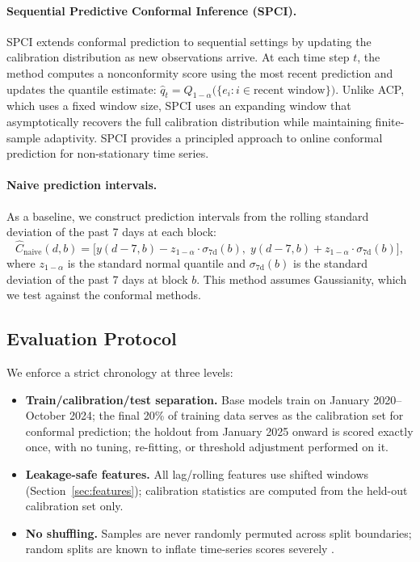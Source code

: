 \documentclass[preprint,12pt]{elsarticle}
\begin{document}
\begin{enumerate}
\paragraph{Sequential Predictive Conformal Inference (SPCI).}
SPCI extends conformal prediction to sequential settings by updating the calibration distribution as new observations arrive. At each time step $t$, the method computes a nonconformity score using the most recent prediction and updates the quantile estimate: $\hat{q}_t = Q_{1-\alpha}\bigl(\{e_i : i \in \text{recent window}\}\bigr)$. Unlike ACP, which uses a fixed window size, SPCI uses an expanding window that asymptotically recovers the full calibration distribution while maintaining finite-sample adaptivity. SPCI provides a principled approach to online conformal prediction for non-stationary time series.

\paragraph{Naive prediction intervals.}
As a baseline, we construct prediction intervals from the rolling standard deviation of the past 7 days at each block:
\begin{equation}
  \hat{C}_{\text{naive}}(d,b) = \bigl[y(d-7,b) - z_{1-\alpha} \cdot \sigma_{7\text{d}}(b), \; y(d-7,b) + z_{1-\alpha} \cdot \sigma_{7\text{d}}(b)\bigr],
  \label{eq:naive_pi}
\end{equation}
where $z_{1-\alpha}$ is the standard normal quantile and $\sigma_{7\text{d}}(b)$ is the standard deviation of the past 7 days at block $b$. This method assumes Gaussianity, which we test against the conformal methods.

\subsection{Evaluation Protocol}\label{sec:protocol}

We enforce a strict chronology at three levels:
\begin{itemize}
  \item \textbf{Train/calibration/test separation.} Base models train on January 2020--October 2024; the final 20\% of training data serves as the calibration set for conformal prediction; the holdout from January 2025 onward is scored exactly once, with no tuning, re-fitting, or threshold adjustment performed on it.
  \item \textbf{Leakage-safe features.} All lag/rolling features use shifted windows (Section~\ref{sec:features}); calibration statistics are computed from the held-out calibration set only.
  \item \textbf{No shuffling.} Samples are never randomly permuted across split boundaries; random splits are known to inflate time-series scores severely \citep{weron2014,lago2021}.
\end{itemize}


\end{enumerate}
\end{document}

